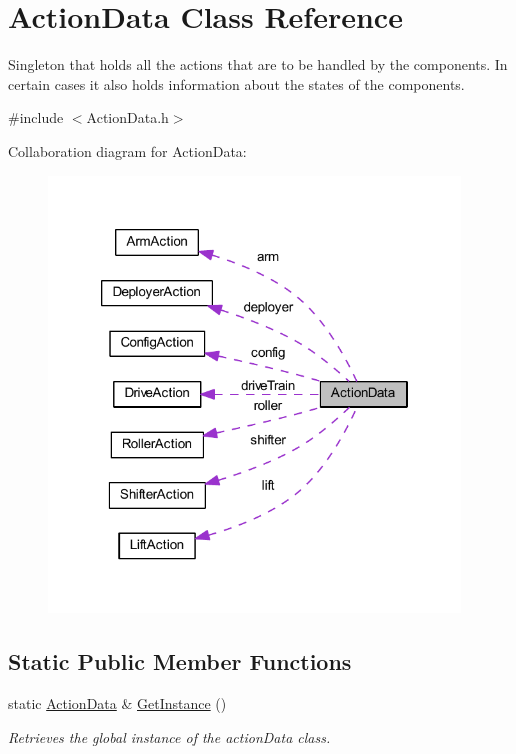 \hypertarget{class_action_data}{
\section{\-Action\-Data \-Class \-Reference}
\label{class_action_data}
}


\-Singleton that holds all the actions that are to be handled by the components. \-In certain cases it also holds information about the states of the components.  




{\ttfamily \#include $<$\-Action\-Data.\-h$>$}



\-Collaboration diagram for \-Action\-Data\-:\nopagebreak
\begin{figure}[H]
\begin{center}
\leavevmode
\includegraphics[width=310pt]{class_action_data__coll__graph}
\end{center}
\end{figure}
\subsection*{\-Static \-Public \-Member \-Functions}
\begin{DoxyCompactItemize}
\item 
\hypertarget{class_action_data_a5a6c1f37d3e4273caf821ae681a42911}{
static \hyperlink{class_action_data}{\-Action\-Data} \& \hyperlink{class_action_data_a5a6c1f37d3e4273caf821ae681a42911}{\-Get\-Instance} ()}
\label{class_action_data_a5a6c1f37d3e4273caf821ae681a42911}

\begin{DoxyCompactList}\small\item\em \-Retrieves the global instance of the action\-Data class. \end{DoxyCompactList}\end{DoxyCompactItemize}
